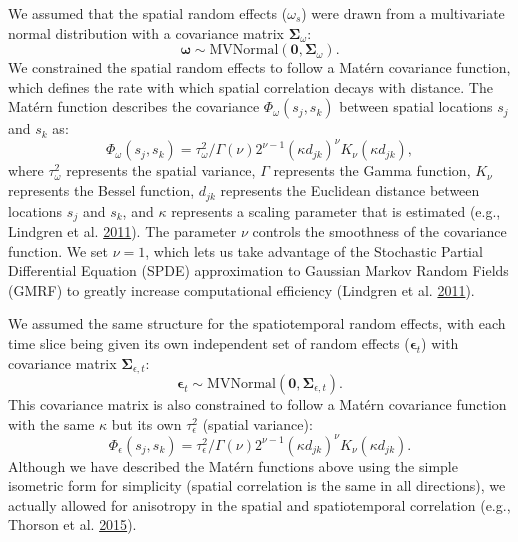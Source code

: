 \documentclass[11pt]{book}
\begin{document}
We assumed that the spatial random effects (\(\omega_s\)) were drawn from a multivariate normal distribution with a covariance matrix \(\bm{\Sigma}_\omega\):
\begin{equation}
\bm{\omega} \sim \mathrm{MVNormal} \left( \bm{0}, \bm{\Sigma}_\omega \right).
\end{equation}
We constrained the spatial random effects to follow a \mbox{Mat\'ern} covariance function, which defines the rate with which spatial correlation decays with distance. The \mbox{Mat\'ern} function describes the covariance \(\Phi_\omega \left( s_j, s_k \right)\) between spatial locations \(s_j\) and \(s_k\) as:
\begin{equation}
\Phi_\omega\left( s_j,s_k \right) = \tau_\omega^2/\Gamma(\nu)2^{\nu - 1}
    (\kappa d_{jk})^\nu K_\nu \left( \kappa d_{jk} \right),
\end{equation}
where \(\tau_\omega^2\) represents the spatial variance, \(\Gamma\) represents the Gamma function, \(K_\nu\) represents the Bessel function, \(d_{jk}\) represents the Euclidean distance between locations \(s_j\) and \(s_k\), and \(\kappa\) represents a scaling parameter that is estimated (e.g., Lindgren et al. \protect\hyperlink{ref-lindgren2011}{2011}). The parameter \(\nu\) controls the smoothness of the covariance function. We set \(\nu = 1\), which lets us take advantage of the Stochastic Partial Differential Equation (SPDE) approximation to Gaussian Markov Random Fields (GMRF) to greatly increase computational efficiency (Lindgren et al. \protect\hyperlink{ref-lindgren2011}{2011}).

We assumed the same structure for the spatiotemporal random effects, with each time slice being given its own independent set of random effects (\(\bm{\epsilon}_t\)) with covariance matrix \(\bm{\Sigma}_{\epsilon,t}\):
\begin{equation}
\bm{\epsilon}_t \sim \mathrm{MVNormal} \left( \bm{0}, \bm{\Sigma}_{\epsilon,t} \right).
\end{equation}
This covariance matrix is also constrained to follow a \mbox{Mat\'ern} covariance function with the same \(\kappa\) but its own \(\tau_\epsilon^2\) (spatial variance):
\begin{equation}
\Phi_\epsilon\left( s_j,s_k \right) = \tau_\epsilon^2/\Gamma(\nu)2^{\nu - 1}
    (\kappa d_{jk})^\nu K_\nu \left( \kappa d_{jk} \right).
\end{equation}
Although we have described the \mbox{Mat\'ern} functions above using the simple isometric form for simplicity (spatial correlation is the same in all directions), we actually allowed for anisotropy in the spatial and spatiotemporal correlation (e.g., Thorson et al. \protect\hyperlink{ref-thorson2015}{2015}).
\end{document}
